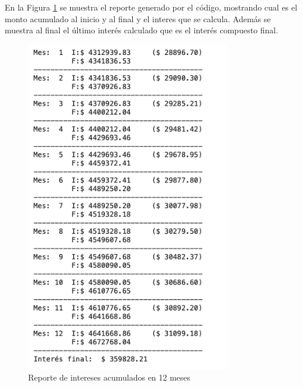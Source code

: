 \documentclass{article}
\begin{document}
\break
\noindent
En la Figura \ref{fig:s106-2} se muestra el reporte generado por el código, mostrando cual es el monto acumulado al inicio y al final y el interes que se calcula. Además se muestra al final el último interés calculado que es el interés compuesto final.
\begin{figure}[!ht]
    \centering
    \begin{minipage}{\textwidth}
        \centering
        \includegraphics[width=0.8\textwidth]{figures/s106-2.png}
    \end{minipage}
    \captionsetup{width=0.9\textwidth}
    \caption{Reporte de intereses acumulados en 12 meses}
    \label{fig:s106-2}
\end{figure}
\end{document}
